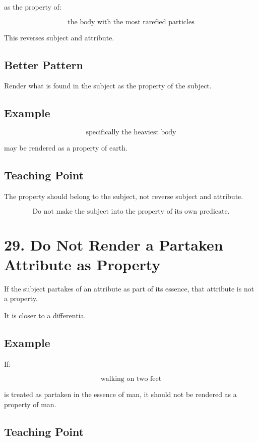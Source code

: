 \documentclass[12pt]{article}
\begin{document}
as the property of:

\[
\text{the body with the most rarefied particles}
\]

This reverses subject and attribute.

\subsection*{Better Pattern}

Render what is found in the subject as the property of the subject.

\subsection*{Example}

\[
\text{specifically the heaviest body}
\]

may be rendered as a property of earth.

\subsection*{Teaching Point}

The property should belong to the subject, not reverse subject and attribute.

\[
\boxed{
\text{Do not make the subject into the property of its own predicate.}
}
\]

\section*{29. Do Not Render a Partaken Attribute as Property}

If the subject partakes of an attribute as part of its essence, that attribute
is not a property.

It is closer to a differentia.

\subsection*{Example}

If:

\[
\text{walking on two feet}
\]

is treated as partaken in the essence of man, it should not be rendered as a
property of man.

\subsection*{Teaching Point}
\end{document}
